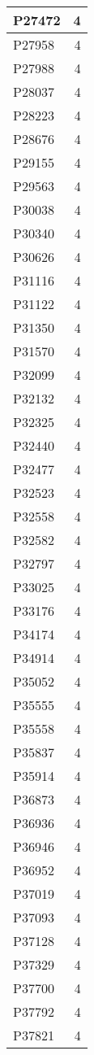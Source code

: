 \documentclass[
]{book}
\theoremstyle{definition}
\theoremstyle{definition}
\theoremstyle{definition}
\theoremstyle{definition}
\theoremstyle{remark}
\begin{document}
\begin{table}
\begin{tabular}{l|r}
\hline
P27472 & 4\\
\hline
P27958 & 4\\
\hline
P27988 & 4\\
\hline
P28037 & 4\\
\hline
P28223 & 4\\
\hline
P28676 & 4\\
\hline
P29155 & 4\\
\hline
P29563 & 4\\
\hline
P30038 & 4\\
\hline
P30340 & 4\\
\hline
P30626 & 4\\
\hline
P31116 & 4\\
\hline
P31122 & 4\\
\hline
P31350 & 4\\
\hline
P31570 & 4\\
\hline
P32099 & 4\\
\hline
P32132 & 4\\
\hline
P32325 & 4\\
\hline
P32440 & 4\\
\hline
P32477 & 4\\
\hline
P32523 & 4\\
\hline
P32558 & 4\\
\hline
P32582 & 4\\
\hline
P32797 & 4\\
\hline
P33025 & 4\\
\hline
P33176 & 4\\
\hline
P34174 & 4\\
\hline
P34914 & 4\\
\hline
P35052 & 4\\
\hline
P35555 & 4\\
\hline
P35558 & 4\\
\hline
P35837 & 4\\
\hline
P35914 & 4\\
\hline
P36873 & 4\\
\hline
P36936 & 4\\
\hline
P36946 & 4\\
\hline
P36952 & 4\\
\hline
P37019 & 4\\
\hline
P37093 & 4\\
\hline
P37128 & 4\\
\hline
P37329 & 4\\
\hline
P37700 & 4\\
\hline
P37792 & 4\\
\hline
P37821 & 4\\

\end{tabular}
\end{table}
\end{document}

